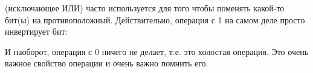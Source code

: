 ﻿\XOR (исключающее ИЛИ) часто используется для того чтобы поменять какой-то бит(ы) на противоположный.
Действительно, операция \XOR с 1 на самом деле просто инвертирует бит:



И наоборот, операция \XOR с 0 ничего не делает, т.е. это холостая операция.
Это очень важное свойство операции \XOR и очень важно помнить его.
